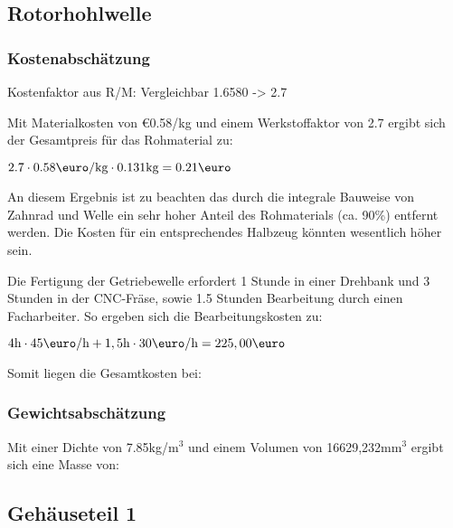 \documentclass[10pt, a4paper]{article}
\begin{document}
\newpage
\subsection{Rotorhohlwelle}
\begin{figure}[h]
  \centering
  \vspace{-10pt}
\end{figure}
\subsubsection{Kostenabschätzung}
\begin{center}
  Kostenfaktor aus R/M: Vergleichbar 1.6580 -> 2.7 \\
\end{center}
Mit Materialkosten von \euro0.58/kg und einem Werkstoffaktor von 2.7 ergibt sich der Gesamtpreis für das Rohmaterial zu: 
\begin{center}
    $2.7 \cdot 0.58\text{\euro/kg} \cdot 0.131\text{kg} = 0.21\text{\euro}$
\end{center}
An diesem Ergebnis ist zu beachten das durch die integrale Bauweise von Zahnrad und Welle ein sehr hoher Anteil des Rohmaterials (ca. 90\%) entfernt werden. Die Kosten für ein entsprechendes Halbzeug könnten wesentlich höher sein.

Die Fertigung der Getriebewelle erfordert 1 Stunde in einer Drehbank und 3 Stunden in der CNC-Fräse, sowie 1.5 Stunden Bearbeitung durch einen Facharbeiter. So ergeben sich die Bearbeitungskosten zu:
\begin{center}
  $4\text{h} \cdot 45\text{\euro/h} + 1,5\text{h} \cdot 30\text{\euro/h}= 225,00\text{\euro}$
\end{center}
Somit liegen die Gesamtkosten bei:
\begin{flushright}
\end{flushright}
\subsubsection{Gewichtsabschätzung}
Mit einer Dichte von 7.85kg/m$^3$ und einem Volumen von 16629,232mm$^3$ ergibt sich eine Masse von:
\begin{flushright}
\end{flushright}

\newpage
\subsection{Gehäuseteil 1}
\begin{figure}[h]
  \centering
  \vspace{-10pt}
\end{figure}
\end{document}
